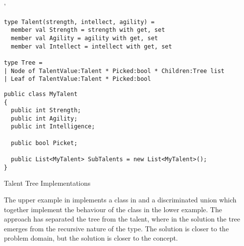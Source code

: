 \begin{listing}[H]'
  \begin{verbatim}
type Talent(strength, intellect, agility) =
  member val Strength = strength with get, set
  member val Agility = agility with get, set
  member val Intellect = intellect with get, set

type Tree =
| Node of TalentValue:Talent * Picked:bool * Children:Tree list
| Leaf of TalentValue:Talent * Picked:bool
  \end{verbatim}
  \begin{verbatim}
public class MyTalent
{
  public int Strength;
  public int Agility;
  public int Intelligence;

  public bool Picket;

  public List<MyTalent> SubTalents = new List<MyTalent>();
}
  \end{verbatim}
  \caption{Talent Tree Implementations}
  \label{lst:tree-imps}
\end{listing}

The upper example in  implements a class in \fs and a discriminated union which together implement the behaviour of the \cs class in the lower example. The \fs approach has separated the tree from the talent, where in the  \cs solution the tree emerges from the recursive nature of the type. The \cs solution is closer to the problem domain, but the \fs solution is closer to the concept. 
